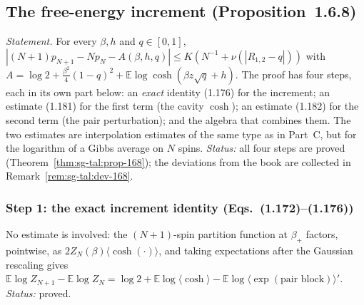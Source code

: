 \subsection{The free-energy increment (Proposition~1.6.8)}
\label{sec:sg-tal:cavity-prop168}

\emph{Statement.} For every $\beta,h$ and $q\in[0,1]$,
$|(N+1)p_{N+1}-Np_N-A(\beta,h,q)|\le K(N^{-1}+\nu(|R_{1,2}-q|))$ with
$A=\log2+\tfrac{\beta^2}{4}(1-q)^2+\mathbb E\log\cosh(\beta z\sqrt q+h)$.
The proof has four steps, each in its own part below:
an \emph{exact} identity (1.176) for the increment; an estimate (1.181) for the first term
(the cavity $\cosh$); an estimate (1.182) for the second term (the pair perturbation); and
the algebra that combines them.  The two estimates are interpolation estimates of the same type as
in Part~C, but for the logarithm of a Gibbs average on $N$ spins.
\emph{Status:} all four steps are proved (Theorem~\ref{thm:sg-tal:prop-168}); the deviations from the
book are collected in Remark~\ref{rem:sg-tal:dev-168}.

\subsubsection{Step 1: the exact increment identity (Eqs.~(1.172)--(1.176))}
No estimate is involved: the $(N+1)$-spin partition function at $\beta_+$ factors, pointwise, as
$2Z_N(\beta)\langle\cosh(\cdot)\rangle$, and taking expectations after the Gaussian rescaling gives
$\mathbb E\log Z_{N+1}-\mathbb E\log Z_N=\log2+\mathbb E\log\langle\cosh\rangle-\mathbb E\log\langle\exp(\text{pair block})\rangle'$.
\emph{Status:} proved.

